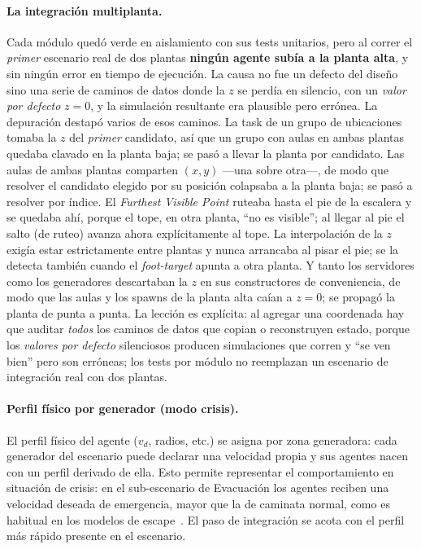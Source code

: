\documentclass[11pt,a4paper]{article}
\begin{document}
\paragraph{La integración multiplanta.}
Cada módulo quedó verde en aislamiento con sus tests unitarios, pero al correr el \emph{primer}
escenario real de dos plantas \textbf{ningún agente subía a la planta alta}, y sin ningún error
en tiempo de ejecución. La causa no fue un defecto del diseño sino una serie de caminos de datos
donde la $z$ se perdía en silencio, con un \emph{valor por defecto} $z=0$, y la simulación resultante era
plausible pero errónea. La depuración destapó varios de esos caminos. La task de un grupo de
ubicaciones tomaba la $z$ del \emph{primer} candidato, así que un grupo con aulas en ambas plantas
quedaba clavado en la planta baja; se pasó a llevar la planta por candidato. Las aulas de ambas
plantas comparten $(x,y)$ ---una sobre otra---, de modo que resolver el candidato elegido por su
posición colapsaba a la planta baja; se pasó a resolver por índice. El \emph{Furthest Visible
Point} ruteaba hasta el pie de la escalera y se quedaba ahí, porque el tope, en otra planta, ``no
es visible''; al llegar al pie el salto (de ruteo) avanza ahora explícitamente al tope. La interpolación de la
$z$ exigía estar estrictamente entre plantas y nunca arrancaba al pisar el pie; se la detecta
también cuando el \emph{foot-target} apunta a otra planta. Y tanto los servidores como los generadores
descartaban la $z$ en sus constructores de conveniencia, de modo que las aulas y los spawns de la
planta alta caían a $z=0$; se propagó la planta de punta a punta. La lección es explícita: al
agregar una coordenada hay que auditar \emph{todos} los caminos de datos que copian o reconstruyen
estado, porque los \emph{valores por defecto} silenciosos producen simulaciones que corren y ``se ven bien''
pero son erróneas; los tests por módulo no reemplazan un escenario de integración real con dos
plantas.

\paragraph{Perfil físico por generador (modo crisis).}
El perfil físico del agente ($v_d$, radios, etc.) se asigna por zona generadora: cada generador
del escenario puede declarar una velocidad propia y sus agentes nacen con un perfil derivado de
ella. Esto permite representar el comportamiento en situación de crisis: en el sub-escenario de
Evacuación los agentes reciben una velocidad deseada de emergencia, mayor que la de caminata
normal, como es habitual en los modelos de escape~\cite{helbing2000}. El paso de integración se
acota con el perfil más rápido presente en el escenario.
\end{document}
